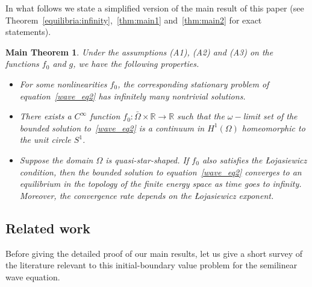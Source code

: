 \documentclass{elsarticle}
\newtheorem*{thm}{Main Theorem}
\begin{document}
In what follows we state a simplified version of the main result of this paper (see Theorem~\ref{equilibria:infinity},~\ref{thm:main1} and~\ref{thm:main2} for exact statements).
\begin{thm}
Under the assumptions {\rm{(A1)}}, {\rm{(A2)}} and {\rm{(A3)}} on the functions $f_0$ and $g$, we have the following properties.
\begin{itemize}
\item For some nonlinearities $f_0$, the corresponding stationary problem of equation~\eqref{wave_eq2} has infinitely many nontrivial solutions.
\item There exists a $C^{\infty}$ function $f_0: \bar{\Omega}\times\mathbb{R}\rightarrow\mathbb{R}$ such that the $\omega-$limit set of the bounded solution to~\eqref{wave_eq2} is a continuum in $H^1(\Omega)$ homeomorphic to the unit circle $S^1$.  
\item Suppose the domain $\Omega$ is quasi-star-shaped. If $f_0$ also satisfies the {\L}ojasiewicz condition, then the bounded solution to equation~\eqref{wave_eq2} converges to an equilibrium in the topology of the finite energy space as time goes to infinity. Moreover, the convergence rate depends on the {\L}ojasiewicz exponent.
\end{itemize}
\end{thm}



\subsection{Related work}
\label{sec:literature}

Before giving the detailed proof of our main results, let us give a short survey of the literature relevant to this initial-boundary value problem for the semilinear wave equation.
\end{document}
